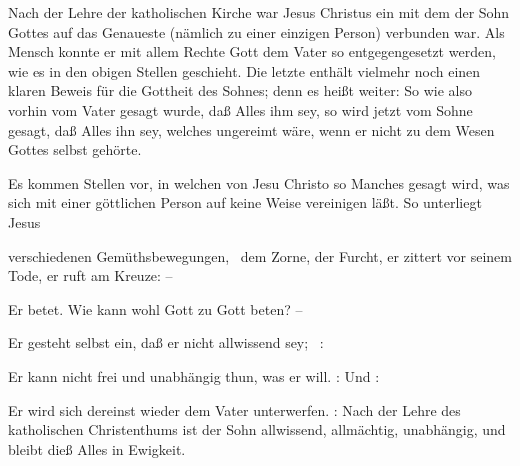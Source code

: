  Nach der Lehre der katholischen Kirche war Jesus Christus ein  mit dem der Sohn Gottes auf das Genaueste (nämlich zu einer einzigen Person) verbunden war. Als Mensch konnte er mit allem Rechte Gott dem Vater so entgegengesetzt werden, wie es in den obigen Stellen geschieht. Die letzte enthält vielmehr noch einen klaren Beweis für die Gottheit des Sohnes; denn es heißt weiter:  So wie also vorhin vom Vater gesagt wurde, daß Alles  ihm sey, so wird jetzt vom Sohne gesagt, daß Alles  ihn sey, welches ungereimt wäre, wenn er nicht zu dem Wesen Gottes selbst gehörte.\par
{} Es kommen Stellen vor, in welchen von Jesu Christo so Manches gesagt wird, was sich mit einer göttlichen Person auf keine Weise vereinigen läßt. So unterliegt Jesus
\begin{aufzb}
\item verschiedenen Gemüthsbewegungen, \zB\ dem Zorne, der Furcht, er zittert vor seinem Tode, er ruft am Kreuze:  --
\item Er betet. Wie kann wohl Gott zu Gott beten? --
\item Er gesteht selbst ein, daß er nicht allwissend sey; \zB\ : 
\item Er kann nicht frei und unabhängig thun, was er will. :  Und : 
\item Er wird sich dereinst wieder dem Vater unterwerfen. :  Nach der Lehre des katholischen Christenthums ist der Sohn allwissend, allmächtig, unabhängig, und bleibt dieß Alles in Ewigkeit.
\end{aufzb}\par
{}
